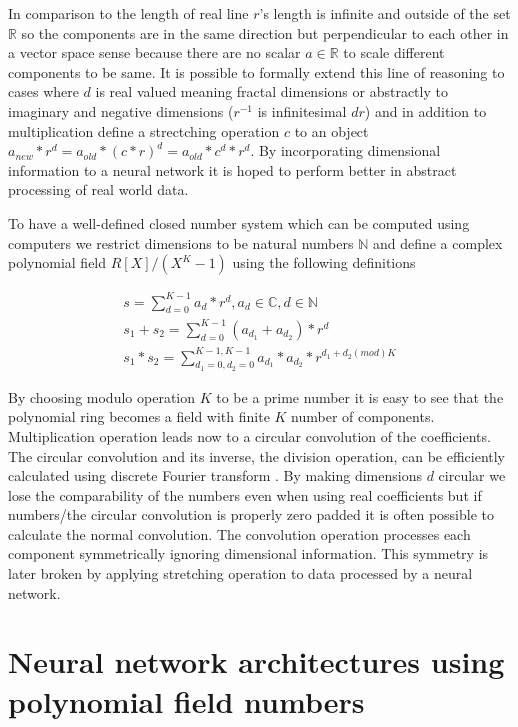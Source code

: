\documentclass[preprint,12pt]{elsarticle}
\begin{document}
In comparison to the length of real line $r$'s length is infinite and outside of the set $\mathbb{R}$ so the components are in the same direction but perpendicular to each other in a vector space sense because there are no scalar $a \in \mathbb{R}$ to scale different components to be same. It is possible to formally extend this line of reasoning to cases where $d$ is real valued meaning fractal dimensions or abstractly to imaginary and negative dimensions ($r^{-1}$ is infinitesimal $dr$) and in addition to multiplication define a strectching operation $c$ to an object $a_{new}*r^d=a_{old}*(c*r)^d=a_{old}*c^d*r^d$. By incorporating dimensional information to a neural network it is hoped to perform better in abstract processing of real world data.

To have a well-defined closed number system which can be computed using computers we restrict dimensions to be natural numbers $\mathbb{N}$ and define a complex polynomial field $R[X]/(X^K-1)$ \cite{discretemathbook} using the following definitions 

\begin{equation}
  \label{polydef}
  \begin{gathered}
    s = \sum_{d=0}^{K-1} a_d*r^{d}, a_d \in \mathbb{C}, d \in \mathbb{N} \\
    s_{1}+s_{2} = \sum_{d=0}^{K-1} (a_{d_{1}}+a_{d_{2}})*r^{d} \\
    s_{1}*s_{2} = \sum_{d_{1}=0,d_{2}=0}^{K-1, K-1} a_{d_{1}}*a_{d_{2}}*r^{d_1+d_2 (mod) K}
  \end{gathered}
\end{equation}

By choosing modulo operation $K$ to be a prime number it is easy to see that the polynomial ring becomes a field with finite $K$ number of components. Multiplication operation leads now to a circular convolution of the coefficients. The circular convolution and its inverse, the division operation, can be efficiently calculated using discrete Fourier transform \cite{mitradspbook}. By making dimensions $d$ circular we lose the comparability of the numbers even when using real coefficients but if numbers/the circular convolution is properly zero padded it is often possible to calculate the normal convolution. The convolution operation processes each component symmetrically ignoring dimensional information. This symmetry is later broken by applying stretching operation to data processed by a neural network.

\section{Neural network architectures using polynomial field numbers}
\label{models}
\end{document}
